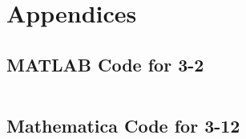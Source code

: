 \documentclass[a4paper]{article}
\begin{document}
\section*{Appendices}
\renewcommand\thesubsection{\Alph{subsection}.}
\subsection{MATLAB Code for 3-2}
\inputminted[frame=single,bgcolor=bg,breaklines,breakanywhere]{matlab}{P3_2.m}
\subsection{Mathematica Code for 3-12}
\inputminted[frame=single,bgcolor=bg,breaklines,breakanywhere]{mathematica}{hw3.nb}
\end{document}
